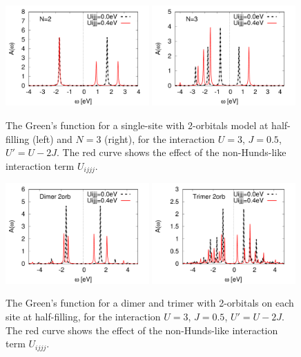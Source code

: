 \documentclass[12pt,a4paper]{scrartcl}
\numberwithin{equation}{section}
\begin{document}
\begin{figure}[h]
 \includegraphics[width=0.49\textwidth]{figs/nonHund/gf_2orb.pdf}
 \includegraphics[width=0.49\textwidth]{figs/nonHund/gf_2orb_N3.pdf}
 \caption{The Green's function for a single-site with 2-orbitals model at half-filling (left) and $N=3$ (right), for the interaction $U=3$, $J=0.5$, $U'=U-2J$. The red curve shows the effect of the non-Hunds-like interaction term $U_{ijjj}$.}
\end{figure}

\begin{figure}[h]
 \includegraphics[width=0.49\textwidth]{figs/nonHund/gf_2orb_dimer.pdf}
 \includegraphics[width=0.49\textwidth]{figs/nonHund/gf_2orb_trimer.pdf}
 \caption{The Green's function for a dimer and trimer with 2-orbitals on each site at half-filling, for the interaction $U=3$, $J=0.5$, $U'=U-2J$. The red curve shows the effect of the non-Hunds-like interaction term $U_{ijjj}$.}
\end{figure}
\end{document}
